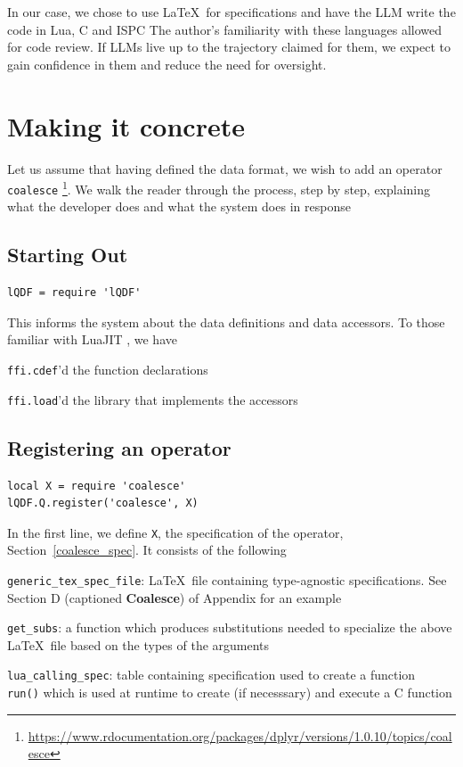 \documentclass[letterpaper,12pt]{article}
\begin{document}
In our case, we chose to use \LaTeX\ for specifications 
and have the LLM write the code in Lua, C and ISPC \cite{ISPC}
The author's familiarity with these languages allowed for code review.
If LLMs live up to the trajectory claimed for them, 
we expect to gain confidence in them and reduce the need for oversight.

\section{Making it concrete}
\label{concrete}

Let us assume that having defined the data format, we wish to add 
an operator {\tt coalesce}
\footnote{\url{https://www.rdocumentation.org/packages/dplyr/versions/1.0.10/topics/coalesce}}.
We walk the reader through the process, step by step, explaining what the
developer does and what the system does in response


\subsection{Starting Out}
\begin{verbatim}
lQDF = require 'lQDF'
\end{verbatim}
This informs the system about the data definitions and data accessors.
To those familiar with LuaJIT \cite{LuaJIT}, we have
\be
\item {\tt ffi.cdef}'d the function declarations
\item {\tt ffi.load}'d the library that implements the accessors
  \ee

  \subsection{Registering an operator}
\begin{verbatim}
local X = require 'coalesce'
lQDF.Q.register('coalesce', X)
\end{verbatim}

In the first line, we define {\tt X}, the specification of the operator, 
Section~\ref{coalesce_spec}. It consists of the following
\be
\item \verb+generic_tex_spec_file+: \LaTeX\ file containing 
  type-agnostic specifications.  
  See Section D (captioned {\bf Coalesce}) of Appendix for an example
\item \verb+get_subs+: a function which produces substitutions needed
  to specialize the above \LaTeX\ file based on the types of the arguments
\item \verb+lua_calling_spec+: table containing specification used to 
  create a function {\tt
  run()} which is used at runtime to create (if necesssary) 
  and execute a C function
  \ee
\end{document}
